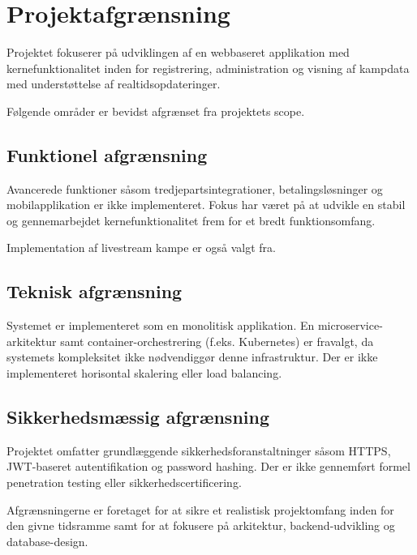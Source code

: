 \documentclass[11pt]{article}
\begin{document}
    \section{Projektafgrænsning}

    Projektet fokuserer på udviklingen af en webbaseret applikation med kernefunktionalitet inden for registrering,
    administration og visning af kampdata med understøttelse af realtidsopdateringer.

    Følgende områder er bevidst afgrænset fra projektets scope.

    \subsection{Funktionel afgrænsning}
    Avancerede funktioner såsom tredjepartsintegrationer, betalingsløsninger
    og mobilapplikation er ikke implementeret. Fokus har været på at udvikle
    en stabil og gennemarbejdet kernefunktionalitet frem for et bredt funktionsomfang.

    Implementation af livestream kampe er også valgt fra.

    \subsection{Teknisk afgrænsning}
    Systemet er implementeret som en monolitisk applikation. En microservice-
    arkitektur samt container-orchestrering (f.eks. Kubernetes) er fravalgt,
    da systemets kompleksitet ikke nødvendiggør denne infrastruktur.
    Der er ikke implementeret horisontal skalering eller load balancing.

    \subsection{Sikkerhedsmæssig afgrænsning}
    Projektet omfatter grundlæggende sikkerhedsforanstaltninger såsom HTTPS,
    JWT-baseret autentifikation og password hashing. Der er ikke gennemført
    formel penetration testing eller sikkerhedscertificering.

    Afgrænsningerne er foretaget for at sikre et realistisk projektomfang
    inden for den givne tidsramme samt for at fokusere på arkitektur,
    backend-udvikling og database-design.
\end{document}
